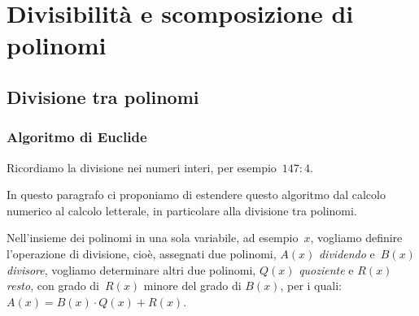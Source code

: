 


\chapter{Divisibilità e scomposizione di polinomi}


\section{Divisione tra polinomi}

\subsection{Algoritmo di Euclide}
\label{subsec:divpol_divisione_euclide}

Ricordiamo la divisione nei numeri interi, per esempio~\(147:4\). 


In questo paragrafo ci proponiamo di estendere questo algoritmo dal 
calcolo numerico al calcolo letterale, in particolare alla divisione 
tra polinomi.

Nell'insieme dei polinomi in una sola variabile, ad esempio~\(x\), 
vogliamo definire l'operazione di divisione, cioè, assegnati due 
polinomi, \(A(x)\) \emph{dividendo} e~\(B(x)\) \emph{divisore}, 
vogliamo determinare altri due polinomi, \(Q(x)\) \emph{quoziente} e 
\(R(x)\) \emph{resto}, con grado di~\(R(x)\) minore del grado di 
\(B(x)\), per i quali:~\(A(x) = B(x){\cdot}Q(x) + R(x)\).

